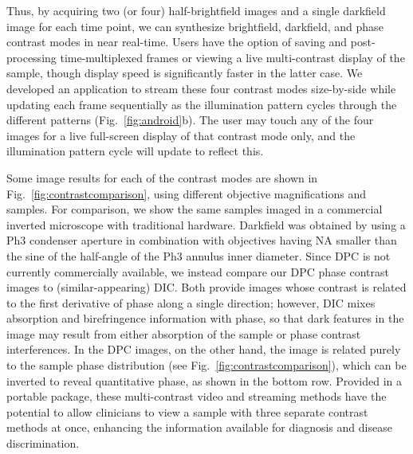 Thus, by acquiring two (or four) half-brightfield images and a single darkfield image for each time point, we can synthesize brightfield, darkfield, and phase contrast modes in near real-time. Users have the option of saving and post-processing time-multiplexed frames or viewing a live multi-contrast display of the sample, though display speed is significantly faster in the latter case. We developed an application to stream these four contrast modes size-by-side while updating each frame sequentially as the illumination pattern cycles through the different patterns (Fig.~\ref{fig:android}b). The user may touch any of the four images for a live full-screen display of that contrast mode only, and the illumination pattern cycle will update to reflect this.

Some image results for each of the contrast modes are shown in Fig.~\ref{fig:contrastcomparison}, using different objective magnifications and samples. For comparison, we show the same samples imaged in a commercial inverted microscope with traditional hardware. Darkfield was obtained by using a Ph3 condenser aperture in combination with objectives having NA smaller than the sine of the half-angle of the Ph3 annulus inner diameter. Since DPC is not currently commercially available, we instead compare our DPC phase contrast images to (similar-appearing) DIC. Both provide images whose contrast is related to the first derivative of phase along a single direction; however, DIC mixes absorption and birefringence information with phase, so that dark features in the image may result from either absorption of the sample or phase contrast interferences. In the DPC images, on the other hand, the image is related purely to the sample phase distribution (see Fig.~\ref{fig:contrastcomparison}), which can be inverted to reveal quantitative phase, as shown in the bottom row. Provided in a portable package, these multi-contrast video and streaming methods have the potential to allow clinicians to view a sample with three separate contrast methods at once, enhancing the information available for diagnosis and disease discrimination.

